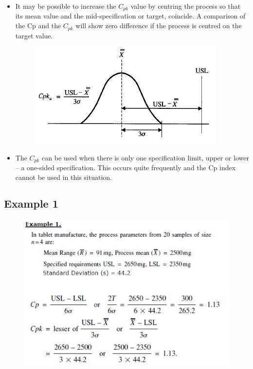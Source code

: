 \documentclass[MASTER-SPC.tex]{subfiles}
\begin{document}
\begin{itemize}
\item	It may be possible to increase the $C_{pk}$ value by centring the process so that its mean value and the mid-specification or target, coincide. A comparison of the Cp and the $C_{pk}$ will show zero difference if the process is centred on the target value.
	
	\begin{figure}[h!]
		\centering
		\includegraphics[width=0.7\linewidth]{proccapindices/image5}
	\end{figure}
	
\item	The $C_{pk}$ can be used when there is only one specification limit, upper or lower – a one-sided specification. This occurs quite frequently and the Cp index cannot be used in this situation.
\end{itemize}
\newpage

					\subsection*{Example 1}
					
					\begin{figure}[h!]
						\centering
						\includegraphics[width=1\linewidth]{proccapindices/Example1}
					\end{figure}
					
\end{document}
